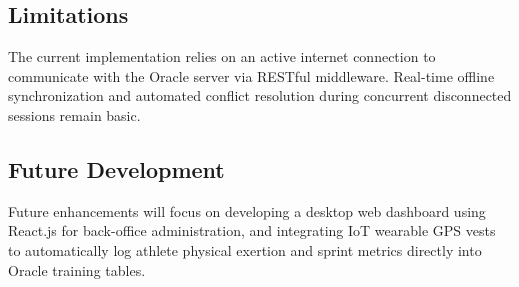 \documentclass[fonts]{icst}
\begin{document}
\subsection{Limitations}
The current implementation relies on an active internet connection to communicate with the Oracle server via RESTful middleware. Real-time offline synchronization and automated conflict resolution during concurrent disconnected sessions remain basic.

\subsection{Future Development}
Future enhancements will focus on developing a desktop web dashboard using React.js for back-office administration, and integrating IoT wearable GPS vests to automatically log athlete physical exertion and sprint metrics directly into Oracle training tables.

\vspace{12pt}


\end{document}
